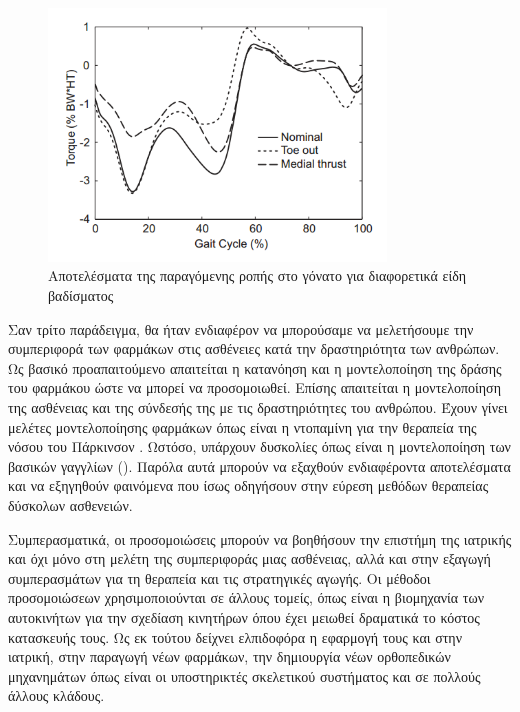 \begin{figure}[H]
    \centering
    \includegraphics[width=0.8\textwidth, keepaspectratio]{fig/knee-load.png}
    \caption{Αποτελέσματα της παραγόμενης ροπής στο γόνατο \cite{fregly07} για διαφορετικά είδη βαδίσματος}
    \label{fig:knee-load}
\end{figure}

Σαν τρίτο παράδειγμα, θα ήταν ενδιαφέρον να μπορούσαμε να μελετήσουμε την συμπεριφορά των φαρμάκων στις ασθένειες κατά την δραστηριότητα των ανθρώπων. Ως βασικό προαπαιτούμενο απαιτείται η κατανόηση και η μοντελοποίηση της δράσης του φαρμάκου ώστε να μπορεί να προσομοιωθεί. Επίσης απαιτείται η μοντελοποίηση της ασθένειας και της σύνδεσής της με τις δραστηριότητες του ανθρώπου. Έχουν γίνει μελέτες μοντελοποίησης φαρμάκων όπως είναι η ντοπαμίνη για την θεραπεία της νόσου του Πάρκινσον \cite{haeri05}. Ωστόσο, υπάρχουν δυσκολίες όπως είναι η μοντελοποίηση των βασικών γαγγλίων (). Παρόλα αυτά μπορούν να εξαχθούν ενδιαφέροντα αποτελέσματα και να εξηγηθούν φαινόμενα που ίσως οδηγήσουν στην εύρεση μεθόδων θεραπείας δύσκολων ασθενειών.

Συμπερασματικά, οι προσομοιώσεις μπορούν να βοηθήσουν την επιστήμη της ιατρικής και όχι μόνο στη μελέτη της συμπεριφοράς μιας ασθένειας, αλλά και στην εξαγωγή συμπερασμάτων για τη θεραπεία και τις στρατηγικές αγωγής. Οι μέθοδοι προσομοιώσεων χρησιμοποιούνται σε άλλους τομείς, όπως είναι η βιομηχανία των αυτοκινήτων για την σχεδίαση κινητήρων όπου έχει μειωθεί δραματικά το κόστος κατασκευής τους. Ως εκ τούτου δείχνει ελπιδοφόρα η εφαρμογή τους και στην ιατρική, στην παραγωγή νέων φαρμάκων, την δημιουργία νέων ορθοπεδικών μηχανημάτων όπως είναι οι υποστηρικτές σκελετικού συστήματος \cite{stopforth12} και σε πολλούς άλλους κλάδους.

